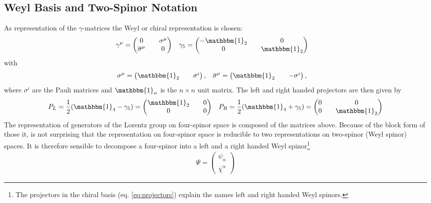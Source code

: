 \subsection{Weyl Basis and Two-Spinor Notation}\label{sec:2spinor_notation}
As representation of the $\gamma$-matrices the Weyl or chiral representation is chosen:
\begin{align}
&\gamma^\mu = \begin{pmatrix}
0 && \sigma^\mu\\
\overline{\sigma}^\mu && 0
\end{pmatrix} &&
\gamma_5 = \begin{pmatrix}
-\mathbbm{1}_2 && 0\\
0 && \mathbbm{1}_2
\end{pmatrix}
\end{align}
with
\begin{align}
&\sigma^\mu = \begin{pmatrix}
\mathbbm{1}_2 && \sigma^i
\end{pmatrix}, &&
\overline{\sigma}^\mu = \begin{pmatrix}
\mathbbm{1}_2 && -\sigma^i
\end{pmatrix},\label{eq:Pauli}
\end{align}
where $\sigma^i$ are the Pauli matrices and $\mathbbm{1}_n$ is the $n \times n$ unit matrix. The left and right handed projectors are then given by
\begin{align}
P_L = \frac{1}{2}(\mathbbm{1}_4 - \gamma_5) = \begin{pmatrix}
\mathbbm{1}_2 && 0\\
0 && 0
\end{pmatrix} && 
P_R = \frac{1}{2}(\mathbbm{1}_4 + \gamma_5) = \begin{pmatrix}
0 && 0\\
0 && \mathbbm{1}_2
\end{pmatrix}\label{eq:projectors}
\end{align}
The representation of generators of the Lorentz group on four-spinor space is composed of the matrices above. Because of the block form of those it, is not surprising that the representation on four-spinor space is reducible to two representations on two-spinor (Weyl spinor) spaces. It is therefore sensible to decompose a four-spinor into a left and a right handed Weyl spinor\footnote{The projectors in the chiral basis (eq. \ref{eq:projectors}) explain the names left and right handed Weyl spinors.}
\begin{align}
\Psi = \begin{pmatrix}
\psi_\alpha \\
\overline{\chi}^{\dot{\alpha}}
\end{pmatrix}
\end{align}
